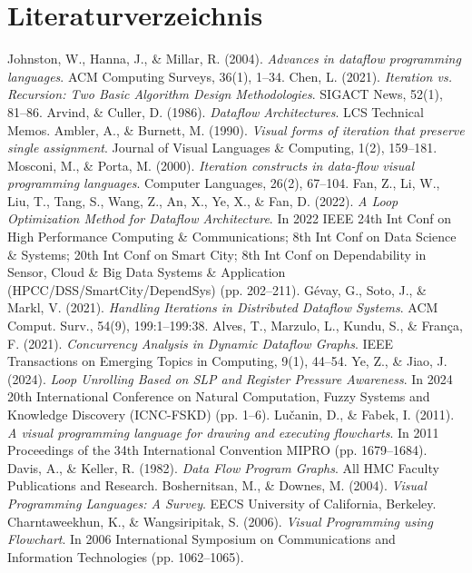 \documentclass{article}
\begin{document}
    \section{Literaturverzeichnis}
    \begin{thebibliography}{9}
        Johnston, W., Hanna, J., \& Millar, R. (2004). \emph{Advances in dataflow programming languages}. ACM Computing Surveys, 36(1), 1–34.
        Chen, L. (2021). \emph{Iteration vs. Recursion: Two Basic Algorithm Design Methodologies}. SIGACT News, 52(1), 81–86.
        Arvind, \& Culler, D. (1986). \emph{Dataflow Architectures}. LCS Technical Memos.
        Ambler, A., \& Burnett, M. (1990). \emph{Visual forms of iteration that preserve single assignment}. Journal of Visual Languages \& Computing, 1(2), 159–181.
        Mosconi, M., \& Porta, M. (2000). \emph{Iteration constructs in data-flow visual programming languages}. Computer Languages, 26(2), 67–104.
        Fan, Z., Li, W., Liu, T., Tang, S., Wang, Z., An, X., Ye, X., \& Fan, D. (2022). \emph{A Loop Optimization Method for Dataflow Architecture}. In 2022 IEEE 24th Int Conf on High Performance Computing \& Communications; 8th Int Conf on Data Science \& Systems; 20th Int Conf on Smart City; 8th Int Conf on Dependability in Sensor, Cloud \& Big Data Systems \& Application (HPCC/DSS/SmartCity/DependSys) (pp. 202–211).
        Gévay, G., Soto, J., \& Markl, V. (2021). \emph{Handling Iterations in Distributed Dataflow Systems}. ACM Comput. Surv., 54(9), 199:1–199:38.
        Alves, T., Marzulo, L., Kundu, S., \& França, F. (2021). \emph{Concurrency Analysis in Dynamic Dataflow Graphs}. IEEE Transactions on Emerging Topics in Computing, 9(1), 44–54.
        Ye, Z., \& Jiao, J. (2024). \emph{Loop Unrolling Based on SLP and Register Pressure Awareness}. In 2024 20th International Conference on Natural Computation, Fuzzy Systems and Knowledge Discovery (ICNC-FSKD) (pp. 1–6).
        Lučanin, D., \& Fabek, I. (2011). \emph{A visual programming language for drawing and executing flowcharts}. In 2011 Proceedings of the 34th International Convention MIPRO (pp. 1679–1684).
        Davis, A., \& Keller, R. (1982). \emph{Data Flow Program Graphs}. All HMC Faculty Publications and Research.
        Boshernitsan, M., \& Downes, M. (2004). \emph{Visual Programming Languages: A Survey}. EECS University of California, Berkeley.
        Charntaweekhun, K., \& Wangsiripitak, S. (2006). \emph{Visual Programming using Flowchart}. In 2006 International Symposium on Communications and Information Technologies (pp. 1062–1065).

\end{thebibliography}
\end{document}
